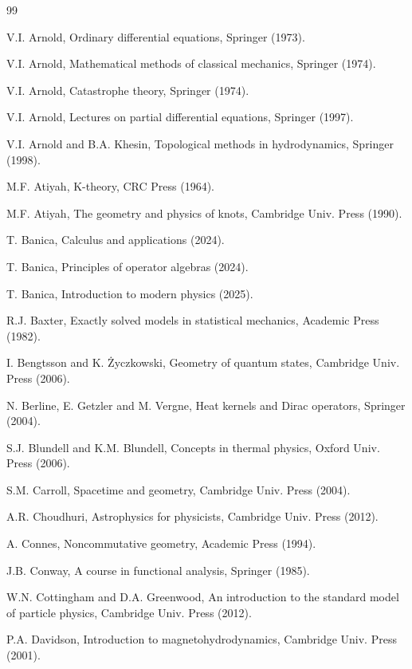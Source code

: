 \documentclass[12pt]{amsbook}
\begin{document}
\begin{thebibliography}{99}

\baselineskip=17pt

V.I. Arnold, Ordinary differential equations, Springer (1973).

V.I. Arnold, Mathematical methods of classical mechanics, Springer (1974).

V.I. Arnold, Catastrophe theory, Springer (1974).

V.I. Arnold, Lectures on partial differential equations, Springer (1997).

V.I. Arnold and B.A. Khesin, Topological methods in hydrodynamics, Springer (1998).

M.F. Atiyah, K-theory, CRC Press (1964).

M.F. Atiyah, The geometry and physics of knots, Cambridge Univ. Press (1990).

T. Banica, Calculus and applications (2024).

T. Banica, Principles of operator algebras (2024).

T. Banica, Introduction to modern physics (2025).

R.J. Baxter, Exactly solved models in statistical mechanics, Academic Press (1982).

I. Bengtsson and K. \.Zyczkowski, Geometry of quantum states, Cambridge Univ. Press (2006).

N. Berline, E. Getzler and M. Vergne, Heat kernels and Dirac operators, Springer (2004).

S.J. Blundell and K.M. Blundell, Concepts in thermal physics, Oxford Univ. Press (2006).

S.M. Carroll, Spacetime and geometry, Cambridge Univ. Press (2004).

A.R. Choudhuri, Astrophysics for physicists, Cambridge Univ. Press (2012).

A. Connes, Noncommutative geometry, Academic Press (1994).

J.B. Conway, A course in functional analysis, Springer (1985).

W.N. Cottingham and D.A. Greenwood, An introduction to the standard model of particle physics, Cambridge Univ. Press (2012).

P.A. Davidson, Introduction to magnetohydrodynamics, Cambridge Univ. Press (2001).


\end{thebibliography}
\end{document}
